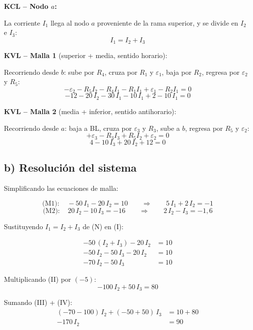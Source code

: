 \documentclass[12pt,letterpaper]{article}
\begin{document}
\begin{minipage}[t]{0.58\textwidth}
\vspace{6pt}

\textbf{KCL -- Nodo $a$:}

La corriente $I_1$ llega al nodo $a$ proveniente de la rama superior, y se divide en $I_2$ e $I_3$:
\[
    \boxed{I_1 = I_2 + I_3} \tag{N}
\]

\medskip
\textbf{KVL -- Malla 1} (superior + media, sentido horario):

Recorriendo desde $b$: sube por $R_4$, cruza por $R_1$ y $\varepsilon_1$, baja por $R_2$, regresa por $\varepsilon_2$ y $R_5$:
\[
    -\varepsilon_2 - R_5 I_2 - R_4 I_1 - R_1 I_1 + \varepsilon_1 - R_2 I_1 = 0
\]
\[
    \boxed{-12 - 20\,I_2 - 30\,I_1 - 10\,I_1 + 2 - 10\,I_1 = 0} \tag{M1}
\]

\medskip
\textbf{KVL -- Malla 2} (media + inferior, sentido antihorario):

Recorriendo desde $a$: baja a BL, cruza por $\varepsilon_3$ y $R_3$, sube a $b$, regresa por $R_5$ y $\varepsilon_2$:
\[
    +\varepsilon_3 - R_3 I_3 + R_5 I_2 + \varepsilon_2 = 0
\]
\[
    \boxed{4 - 10\,I_3 + 20\,I_2 + 12 = 0} \tag{M2}
\]
\end{minipage}

\newpage

\subsection*{b) Resoluci\'on del sistema}

Simplificando las ecuaciones de malla:

\[
    \text{(M1)}: \quad -50\,I_1 - 20\,I_2 = 10 \qquad \Rightarrow \qquad 5\,I_1 + 2\,I_2 = -1
    \tag{I}
\]
\[
    \text{(M2)}: \quad 20\,I_2 - 10\,I_3 = -16 \qquad \Rightarrow \qquad 2\,I_2 - I_3 = -1{,}6
    \tag{II}
\]

Sustituyendo $I_1 = I_2 + I_3$ de (N) en (I):

\begin{align*}
    -50\,(I_2 + I_3) - 20\,I_2 &= 10 \\
    -50\,I_2 - 50\,I_3 - 20\,I_2 &= 10 \\
    -70\,I_2 - 50\,I_3 &= 10 \tag{III}
\end{align*}

Multiplicando (II) por $(-5)$:
\[
    -100\,I_2 + 50\,I_3 = 80 \tag{IV}
\]

Sumando (III) + (IV):
\begin{align*}
    (-70 - 100)\,I_2 + (-50 + 50)\,I_3 &= 10 + 80 \\
    -170\,I_2 &= 90
\end{align*}
\end{document}
